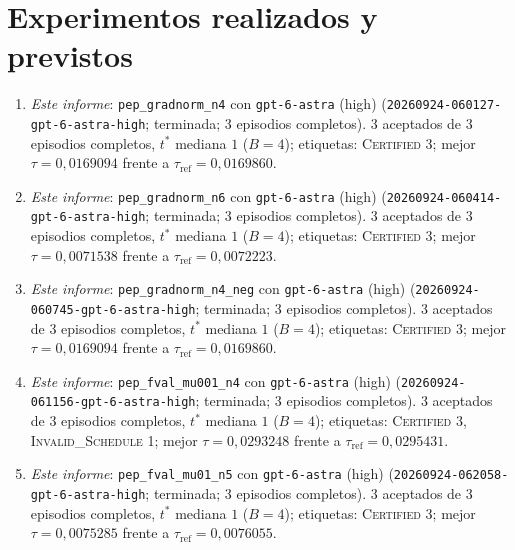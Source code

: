 \documentclass[11pt,a4paper]{article}
\begin{document}
\section{Experimentos realizados y previstos}

{\raggedright
\begin{enumerate}
  \item \emph{Este informe}: \texttt{pep\_\allowbreak{}gradnorm\_\allowbreak{}n4} con \texttt{gpt-\allowbreak{}6-\allowbreak{}astra} (high) (\texttt{20260924-\allowbreak{}060127-\allowbreak{}gpt-\allowbreak{}6-\allowbreak{}astra-\allowbreak{}high}; terminada; 3 episodios completos). 3 aceptados de 3 episodios completos, $t^*$ mediana $1$ ($B = 4$); etiquetas: \textsc{Certified} 3; mejor $\tau = 0{,}0169094$ frente a $\tau_{\mathrm{ref}} = 0{,}0169860$.
  \item \emph{Este informe}: \texttt{pep\_\allowbreak{}gradnorm\_\allowbreak{}n6} con \texttt{gpt-\allowbreak{}6-\allowbreak{}astra} (high) (\texttt{20260924-\allowbreak{}060414-\allowbreak{}gpt-\allowbreak{}6-\allowbreak{}astra-\allowbreak{}high}; terminada; 3 episodios completos). 3 aceptados de 3 episodios completos, $t^*$ mediana $1$ ($B = 4$); etiquetas: \textsc{Certified} 3; mejor $\tau = 0{,}0071538$ frente a $\tau_{\mathrm{ref}} = 0{,}0072223$.
  \item \emph{Este informe}: \texttt{pep\_\allowbreak{}gradnorm\_\allowbreak{}n4\_\allowbreak{}neg} con \texttt{gpt-\allowbreak{}6-\allowbreak{}astra} (high) (\texttt{20260924-\allowbreak{}060745-\allowbreak{}gpt-\allowbreak{}6-\allowbreak{}astra-\allowbreak{}high}; terminada; 3 episodios completos). 3 aceptados de 3 episodios completos, $t^*$ mediana $1$ ($B = 4$); etiquetas: \textsc{Certified} 3; mejor $\tau = 0{,}0169094$ frente a $\tau_{\mathrm{ref}} = 0{,}0169860$.
  \item \emph{Este informe}: \texttt{pep\_\allowbreak{}fval\_\allowbreak{}mu001\_\allowbreak{}n4} con \texttt{gpt-\allowbreak{}6-\allowbreak{}astra} (high) (\texttt{20260924-\allowbreak{}061156-\allowbreak{}gpt-\allowbreak{}6-\allowbreak{}astra-\allowbreak{}high}; terminada; 3 episodios completos). 3 aceptados de 3 episodios completos, $t^*$ mediana $1$ ($B = 4$); etiquetas: \textsc{Certified} 3, \textsc{Invalid\_Schedule} 1; mejor $\tau = 0{,}0293248$ frente a $\tau_{\mathrm{ref}} = 0{,}0295431$.
  \item \emph{Este informe}: \texttt{pep\_\allowbreak{}fval\_\allowbreak{}mu01\_\allowbreak{}n5} con \texttt{gpt-\allowbreak{}6-\allowbreak{}astra} (high) (\texttt{20260924-\allowbreak{}062058-\allowbreak{}gpt-\allowbreak{}6-\allowbreak{}astra-\allowbreak{}high}; terminada; 3 episodios completos). 3 aceptados de 3 episodios completos, $t^*$ mediana $1$ ($B = 4$); etiquetas: \textsc{Certified} 3; mejor $\tau = 0{,}0075285$ frente a $\tau_{\mathrm{ref}} = 0{,}0076055$.

\end{enumerate}}
\end{document}
